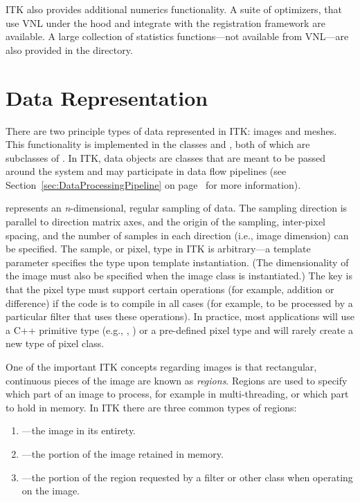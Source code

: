 ITK also provides additional numerics functionality. A suite of optimizers, that
use VNL under the hood and integrate with the registration framework
are available. A large collection of statistics functions---not available from
VNL---are also provided in the 
directory.


\section{Data Representation}%
\label{sec:DataRepresentationAndAccess}%

There are two principle types of data represented in ITK: images and
meshes. This functionality is implemented in the classes
 and , both of which are subclasses of
. In ITK, data objects are classes that are meant to
be passed around the system and may participate in data flow pipelines (see
Section~\ref{sec:DataProcessingPipeline} on
page~\pageref{sec:DataProcessingPipeline} for more information).%

 represents an \emph{n}-dimensional, regular sampling of
data. The sampling direction is parallel to direction matrix axes, and
the origin of the sampling, inter-pixel spacing, and the number of samples in
each direction (i.e., image dimension) can be specified. The sample, or
pixel, type in ITK is arbitrary---a template parameter 
specifies the type upon template instantiation. (The dimensionality of the
image must also be specified when the image class is instantiated.) The key
is that the pixel type must support certain operations (for example, addition
or difference) if the code is to compile in all cases (for example, to be
processed by a particular filter that uses these operations). In practice,
most applications will use a C++ primitive type (e.g., , )
or a pre-defined pixel type and will rarely create a new type of pixel class.

One of the important ITK concepts regarding images is that rectangular,
continuous pieces of the image are known as \emph{regions}. Regions are used
to specify which part of an image to process, for example in multi-threading,
or which part to hold in memory. In ITK there are three common types of
regions:
\begin{enumerate}
\item {}---the image in its entirety.
\item {}---the portion of the image retained in memory.
\item {}---the portion of the region requested by a
filter or other class when operating on the image.
\end{enumerate}%

